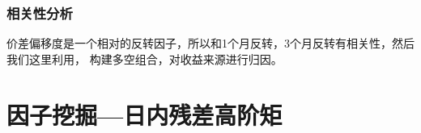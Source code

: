\documentclass[12pt]{article}
\begin{document}
\subsubsection{相关性分析}
价差偏移度是一个相对的反转因子，所以和1个月反转，3个月反转有相关性，然后我们这里利用，
构建多空组合，对收益来源进行归因。


\section{因子挖掘—日内残差高阶矩}






%
%
\end{document}
